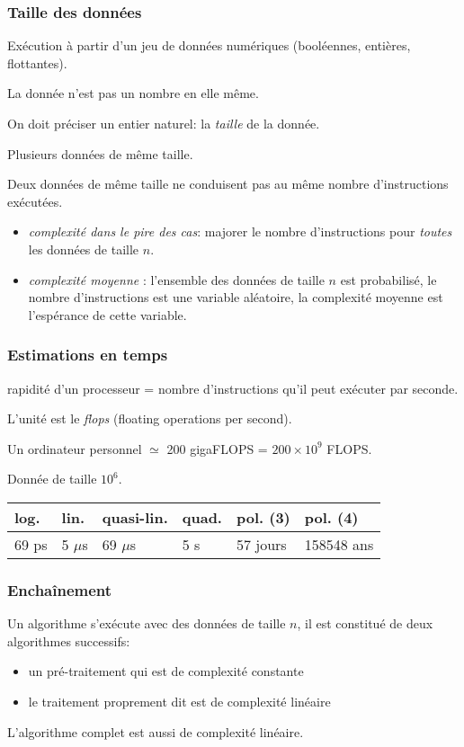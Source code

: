 \begin{frame}
  \frametitle{Taille des données}
Exécution à partir d'un jeu de données numériques (booléennes, entières, flottantes).

La donnée n'est pas un nombre en elle même.

On doit préciser un entier naturel: la \emph{taille} de la donnée.

Plusieurs données de même taille.

Deux données de même taille ne conduisent pas au même nombre d'instructions exécutées.
\begin{itemize}
  \item \emph{complexité dans le pire des cas}: majorer le nombre d'instructions pour \emph{toutes} les données de taille $n$.
  \item \emph{complexité moyenne} : l'ensemble des données de taille $n$ est probabilisé, le nombre d'instructions est une variable aléatoire, la complexité moyenne est l'espérance de cette variable.
\end{itemize}
\end{frame}

\begin{frame}
  \frametitle{Estimations en temps}
rapidité d'un processeur = nombre d'instructions qu'il peut exécuter par seconde.

L'unité est le \emph{flops} (floating operations per second).

Un ordinateur personnel $\simeq$ 200 gigaFLOPS = $200\times 10^{9}$ FLOPS.

Donnée de taille $10^{6}$.
\begin{center}
\renewcommand{\arraystretch}{1.5}
\begin{tabular}{|l|l|l|l|l|l|} \hline
log. & lin. & quasi-lin. & quad. & pol. (3) & pol. (4)\\ \hline
69 ps & 5 $\mu$s & 69 $\mu$s & 5 s & 57 jours & 158548 ans \\ \hline
\end{tabular}
\end{center}
\end{frame}

\begin{frame}
  \frametitle{Enchaînement}
Un algorithme s'exécute avec des données de taille $n$, il est constitué de deux algorithmes successifs:
\begin{itemize}
  \item un pré-traitement qui est de complexité constante
  \item le traitement proprement dit est de complexité linéaire  
\end{itemize}
L'algorithme complet est aussi de complexité linéaire.
\end{frame}

